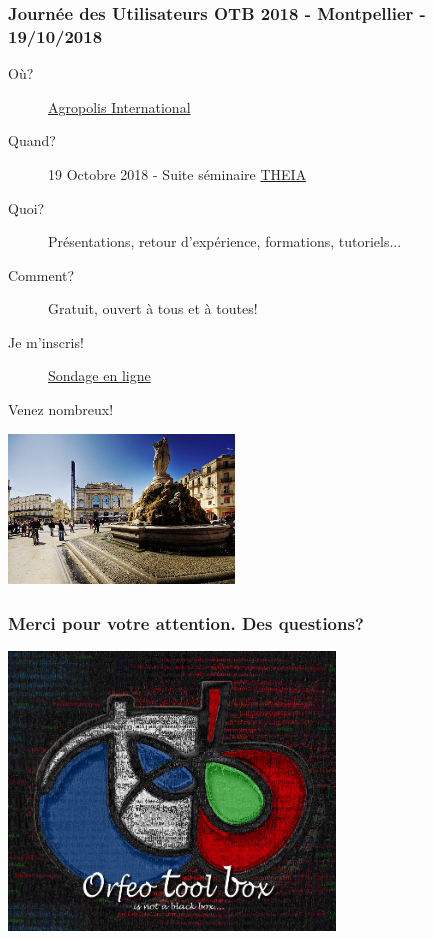 \documentclass[8pt]{beamer}
\begin{document}
\begin{frame}
  \frametitle{Journée des Utilisateurs OTB 2018 - Montpellier - 19/10/2018}
  \begin{description}
  \item[Où?] \href{http://www.agropolis.fr/pratique/locaux.php}{Agropolis International}
  \item[Quand?] 19 Octobre 2018 - Suite séminaire \href{http://theia2018.sciencesconf.org}{THEIA}
  \item[Quoi?] Présentations, retour d'expérience, formations, tutoriels...
  \item[Comment?] Gratuit, ouvert à tous et à toutes!
  \item[Je m'inscris!] \href{https://tinyurl.com/y7yzjvad}{Sondage en ligne}
  \end{description}
  \begin{center}
    \alert{Venez nombreux!}
  \end{center}
  \begin{center}
    \includegraphics[width=0.45\textwidth]{images/montpellier.jpg}
  \end{center}

  
\end{frame}
  
\begin{frame}
\frametitle{Merci pour votre attention. Des questions?}
\begin{minipage}[t][6cm][t]{\textwidth}
\begin{center}
\includegraphics[width=0.65\textwidth]{images/LOGOTB_blackbox.png}
\end{center}
\end{minipage}
\end{frame}
\end{document}
